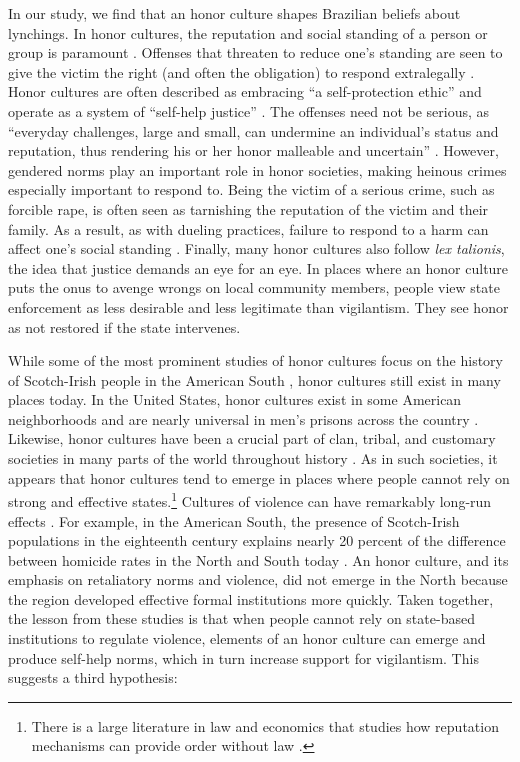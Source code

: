 \documentclass[12pt,a4paper]{article}
\begin{document}
In our study, we find that an honor culture shapes Brazilian beliefs about lynchings. In honor cultures, the reputation and social standing of a person or group is paramount \citep{nisbett2018culture,crowder2017new, vandello2008us, Cao2021honor}. Offenses that threaten to reduce one's standing are seen to give the victim the right (and often the obligation) to respond extralegally \citep{brown2016honor}. Honor cultures are often described as embracing ``a self-protection ethic'' and operate as a system of ``self-help justice'' \citep[1287, 1290]{grosjean2014history}. The offenses need not be serious, as ``everyday challenges, large and small, can undermine an individual's status and reputation, thus rendering his or her honor malleable and uncertain'' \citep[522]{crowder2017new}. However, gendered norms play an important role in honor societies, making heinous crimes especially important to respond to. Being the victim of a serious crime, such as forcible rape, is often seen as tarnishing the reputation of the victim and their family. As a result, as with dueling practices, failure to respond to a harm can affect one's social standing \citep{allen2006duel}. Finally, many honor cultures also follow \textit{lex talionis}, the idea that justice demands an eye for an eye. In places where an honor culture puts the onus to avenge wrongs on local community members, people view state enforcement as less desirable and less legitimate than vigilantism. They see honor as not restored if the state intervenes. 

While some of the most prominent studies of honor cultures focus on the history of Scotch-Irish people in the American South \citep[for example,][662-668]{fischer1989albion}, honor cultures still exist in many places today. In the United States, honor cultures exist in some American neighborhoods and are nearly universal in men's prisons across the country \citep{anderson2000code,fleisher2009myth}. Likewise, honor cultures have been a crucial part of clan, tribal, and customary societies in many parts of the world throughout history \citep{weiner2013rule}. As in such societies, it appears that honor cultures tend to emerge in places where people cannot rely on strong and effective states.\footnote{There is a large literature in law and economics that studies how reputation mechanisms can provide order without law \citep{bernstein1992opting,ellickson1991order,greif2006institutions, leeson2014anarchy}.} Cultures of violence can have remarkably long-run effects \citep{vandello2008us}. For example, in the American South, the presence of Scotch-Irish populations in the eighteenth century explains nearly 20 percent of the difference between homicide rates in the North and South today \citep[1286]{grosjean2014history}. An honor culture, and its emphasis on retaliatory norms and violence, did not emerge in the North because the region developed effective formal institutions more quickly. Taken together, the lesson from these studies is that when people cannot rely on state-based institutions to regulate violence, elements of an honor culture can emerge and produce self-help norms, which in turn increase support for vigilantism. This suggests a third hypothesis: 
\end{document}
